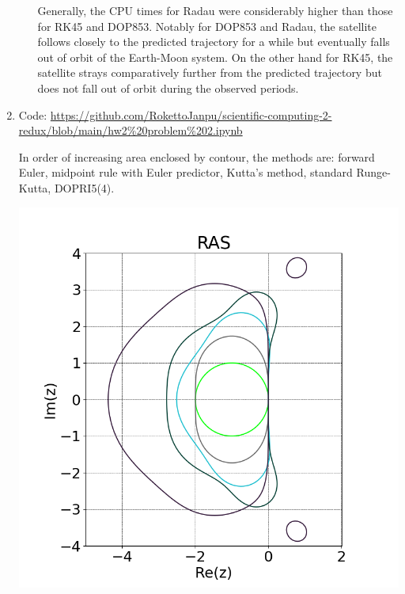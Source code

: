 \documentclass{article}
\begin{document}
\begin{enumerate}
\begin{enumerate}[label=(\alph*)]
	Generally, the CPU times for Radau were considerably higher than those for RK45 and DOP853. Notably for DOP853 and Radau, the satellite follows closely to the predicted trajectory for a while but eventually falls out of orbit of the Earth-Moon system. On the other hand for RK45, the satellite strays comparatively further from the predicted trajectory but does not fall out of orbit during the observed periods.
	
\end{enumerate}



\item Code: \url{https://github.com/RokettoJanpu/scientific-computing-2-redux/blob/main/hw2%20problem%202.ipynb}

In order of increasing area enclosed by contour, the methods are: forward Euler, midpoint rule with Euler predictor, Kutta's method, standard Runge-Kutta, DOPRI5(4).

\begin{center}
	\includegraphics[scale=.35]{hw2 problem 2 RAS}
\end{center}




\end{enumerate}
\end{document}
